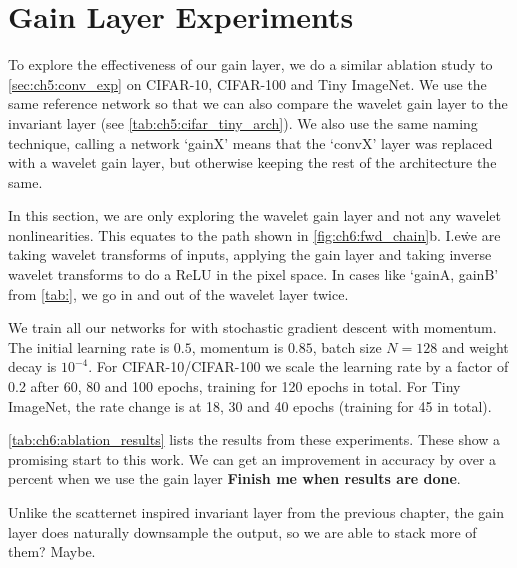\section{Gain Layer Experiments}\label{sec:ch6:gainlayer_experiments}
To explore the effectiveness of our gain layer, we do a similar ablation study
to \autoref{sec:ch5:conv_exp} on CIFAR-10, CIFAR-100 and Tiny ImageNet. We use
the same reference network so that we can also compare the wavelet gain layer to the
invariant layer (see \autoref{tab:ch5:cifar_tiny_arch}). We also use the same
naming technique, calling a network `gainX' means that the `convX' layer was
replaced with a wavelet gain layer, but otherwise keeping the rest of the
architecture the same. 

In this section, we are only exploring the wavelet gain layer and not any
wavelet nonlinearities. This equates to the path shown in \autoref{fig:ch6:fwd_chain}b. 
I.e\. we are taking wavelet transforms of inputs, applying the gain layer and
taking inverse wavelet transforms to do a ReLU in the pixel space. In cases like
`gainA, gainB' from \autoref{tab:}, we go in and out of the wavelet layer twice.

We train all our networks for with stochastic gradient descent with momentum.
The initial learning rate is $0.5$, momentum is $0.85$, batch size $N=128$ and
weight decay is $10^{-4}$. For CIFAR-10/CIFAR-100 we scale the learning rate by
a factor of 0.2 after 60, 80 and 100 epochs, training for 120 epochs in total.
For Tiny ImageNet, the rate change is at 18, 30 and 40 epochs (training for 45 in total).



\autoref{tab:ch6:ablation_results} lists the results from these experiments.
These show a promising start to this work. We can get an improvement in accuracy
by over a percent when we use the gain layer \textbf{Finish me when results are
done}.

Unlike the scatternet inspired invariant layer from the previous chapter, the
gain layer does naturally downsample the output, so we are able to stack more of
them? Maybe.

